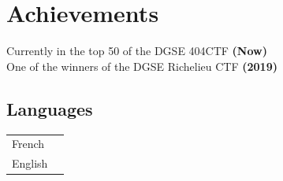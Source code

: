 \documentclass[a4paper,10pt]{article}
\begin{document}
\begin{adjustbox}{valign=t}
\begin{minipage}{0.6\textwidth}


\section*{Achievements}
\begin{spacing}{1.0}
    \raggedright
    Currently in the top 50 of the DGSE 404CTF \textbf{(Now)}\\
    One of the winners of the DGSE Richelieu CTF \textbf{(2019)}
\end{spacing}

\setlength{\columnsep}{-2cm}
\begin{multicols}{2}

\section*{Languages}
\begin{tabular}{ll}
	French 		& \SkillBull{$\bullet \bullet \bullet \bullet \bullet$}\\
	English 		& \SkillBull{$\bullet \bullet \bullet \bullet \bullet$}\\
\end{tabular}


\end{multicols}
\end{minipage}
\end{adjustbox}
\end{document}
